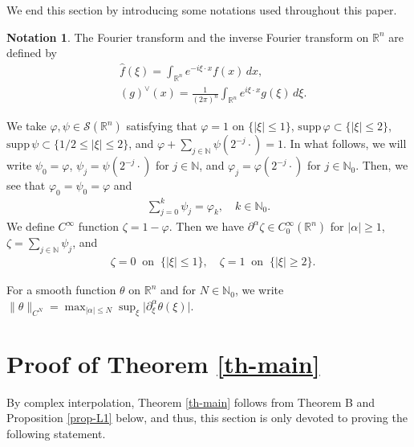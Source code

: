 \documentclass[12pt]{amsart}
\numberwithin{equation}{section}
\theoremstyle{plain}
\theoremstyle{definition}
\newtheorem{notation}[thm]{Notation}
\newcommand{\N}{\mathbb{N}}
\newcommand{\R}{\mathbb{R}}
\newcommand{\calS}{\mathcal{S}}
\newcommand{\supp}{\mathrm{supp}\, }
\begin{document}
We end this section by introducing 
some notations used throughout this paper.
\begin{notation}\label{notation}
The Fourier transform and the inverse Fourier transform 
on $\R^n$ are defined by 
\begin{align*}&
\widehat{f}(\xi)
=
\int_{\R^n}
e^{-i \xi \cdot x}
f(x)\, dx ,
\\&
(g)^{\vee}(x)
=
\frac{1}{(2\pi)^n} 
\int_{\R^n}
e^{i \xi \cdot x}
g(\xi)\, d\xi. 
\end{align*}

We take $\varphi, \psi \in \calS (\R^n)$ 
satisfying that 
$\varphi = 1$ on 
$\{ |\xi| \le 1 \}$,
$\supp \varphi \subset 
\{ |\xi| \le 2 \}$,
$\supp \psi \subset 
\{ 1/2 \leq |\xi| \leq 2 \}$,
and
$\varphi+\sum_{j\in\N} \psi ( 2^{-j} \cdot ) = 1$.
In what follows, we will write
$\psi_{0} = \varphi$,
$\psi_j = \psi ( 2^{-j} \cdot )$ 
for $j \in \N$, 
and 
$\varphi_j = \varphi ( 2^{-j} \cdot )$ 
for $j \in \N_{0}$.
Then, we see that 
$\varphi_0 = \psi_0 = \varphi$ and
\begin{align*}
\sum_{j=0}^{k} \psi_j = \varphi_k,  
\quad k\in \N_0. 
\end{align*}
We define $C^{\infty}$ function
$\zeta = 1 - \varphi$.
Then we have
$\partial^{\alpha} \zeta 
\in C^{\infty}_{0} (\R^n)$
for $|\alpha|\ge 1$,
$\zeta = \sum_{j \in \N} \psi_{j}$,
and
\begin{align*} &
\zeta =0 \;\; \text{on}\;\; \{ |\xi|\le 1 \},
\quad
\zeta =1 \;\; \text{on}\;\; \{ |\xi|\ge 2 \}.
\end{align*}

For a smooth function $\theta$ on $\R^n$ and 
for $N \in \N_{0}$, we write 
$\|\theta\|_{C^N}=
\max_{|\alpha|\le N} 
\sup_{\xi} \big| \partial_{\xi}^{\alpha} \theta (\xi) \big|$. 

\end{notation}


\section{Proof of Theorem \ref{th-main}}
\label{pf-thm}


By complex interpolation,
Theorem \ref{th-main} follows from
Theorem B and Proposition \ref{prop-L1} below,
and thus, this section is only devoted to proving 
the following statement.
\end{document}
